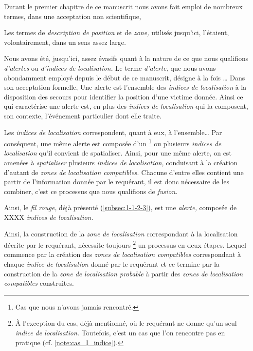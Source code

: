 


Durant le premier chapitre de ce manuscrit nous avons fait emploi de
nombreux termes, dans une acceptation non scientifique, 

Les termes de \emph{description de position} et de \emph{zone,}
utilisés jusqu'ici, l'étaient, volontairement, dans un sens assez
large.


Nous avons été, jusqu'ici, assez évasifs quant à la nature de ce que
nous qualifions \emph{d'alertes} ou \emph{d'indices de localisation.}
Le terme \emph{d'alerte,} que nous avons abondamment employé depuis le
début de ce manuscrit, désigne à la fois …
%
Dans son acceptation formelle,
%
Une alerte est l'ensemble des \emph{indices de localisation} à la
disposition des secours pour identifier la position d'une victime
donnée. Ainsi ce qui caractérise une alerte est, en plus des
\emph{indices de localisation} qui la composent, son contexte, \ie
l'événement particulier dont elle traite.




Les \emph{indices de localisation} correspondent, quant à eux, à
l'ensemble…
%
Par conséquent, une même alerte est composée d'un
\footnote{\label{note:cas_1_indice}Cas que nous n'avons jamais
  rencontré.} ou plusieurs \emph{indices de localisation} qu'il
convient de spatialiser. Ainsi, pour une même alerte, on est amenées à
\emph{spatialiser} plusieurs \emph{indices de localisation,}
conduisant à la création d'autant de \emph{zones de localisation
  compatibles.} Chacune d'entre elles contient une partir de
l'information donnée par le requérant, il est donc nécessaire de les
combiner, c'est ce processus que nous qualifions de \emph{fusion.}

Ainsi, le \emph{fil rouge,} déjà présenté (\autoref{subsec:1-1-2-3}),
est une \emph{alerte,} composée de XXXX \emph{indices de localisation.}

Ainsi, la construction de la \emph{zone de localisation} correspondant
à la localisation décrite par le requérant, nécessite toujours
\footnote{À l'exception du cas, déjà mentionné, où le requérant ne
  donne qu'un seul \emph{indice de localisation.} Toutefois, c'est un
  cas que l'on rencontre pas en pratique
  (cf. \autoref{note:cas_1_indice}).} un processus en deux
étapes. Lequel commence par la création des \emph{zones de
  localisation compatibles} correspondant à chaque \emph{indice de
  localisation} donné par le requérant et ce termine par la
construction de la \emph{zone de localisation probable} à partir des
\emph{zones de localisation compatibles} construites.

